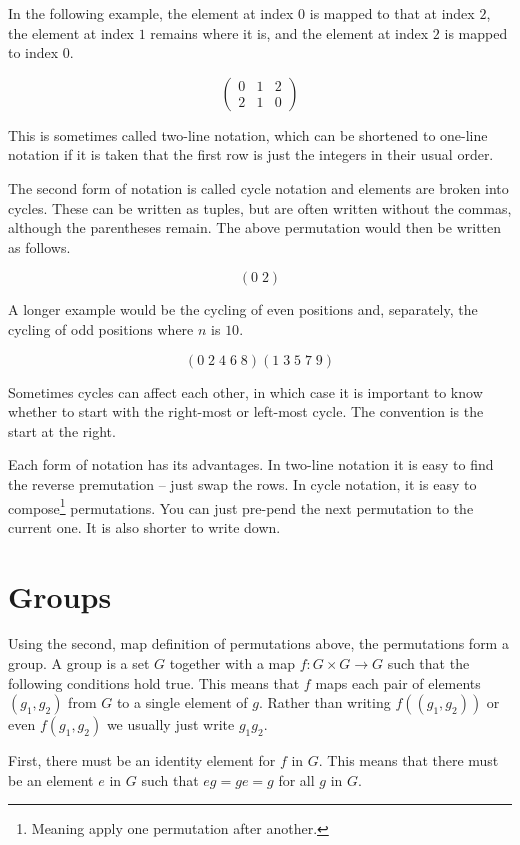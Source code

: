 \documentclass{iansnotes}
\begin{document}
  In the following example, the element at index $0$ is mapped to that at index $2$, the element at index $1$ remains where it is, and the element at index $2$ is mapped to index $0$.

  $$\begin{pmatrix} 0 & 1 & 2 \\ 2 & 1 & 0 \end{pmatrix}$$

  This is sometimes called two-line notation, which can be shortened to one-line notation if it is taken that the first row is just the integers in their usual order.

  The second form of notation is called cycle notation and elements are broken into cycles.
  These can be written as tuples, but are often written without the commas, although the parentheses remain.
  The above permutation would then be written as follows.

  $$ (0 \; 2) $$

  A longer example would be the cycling of even positions and, separately, the cycling of odd positions where $n$ is $10$.

  $$ (0 \; 2 \; 4 \; 6 \; 8 )(1 \; 3 \; 5 \; 7 \; 9 ) $$

  Sometimes cycles can affect each other, in which case it is important to know whether to start with the right-most or left-most cycle.
  The convention is the start at the right.

  Each form of notation has its advantages.
  In two-line notation it is easy to find the reverse premutation -- just swap the rows.
  In cycle notation, it is easy to compose\footnote{Meaning apply one permutation after another.} permutations.
  You can just pre-pend the next permutation to the current one.
  It is also shorter to write down.
  

\section{Groups}
  Using the second, map definition of permutations above, the permutations form a group.
  A group is a set $G$ together with a map $f: G \times G \rightarrow G$ such that the following conditions hold true.
  This means that $f$ maps each pair of elements $(g_1,g_2)$ from $G$ to a single element of $g$.
  Rather than writing $f((g_1,g_2))$ or even $f(g_1,g_2)$ we usually just write $g_1g_2$.
  
  First, there must be an identity element for $f$ in $G$.
  This means that there must be an element $e$ in $G$ such that $eg = ge = g$ for all $g$ in $G$.
  
\end{document}
